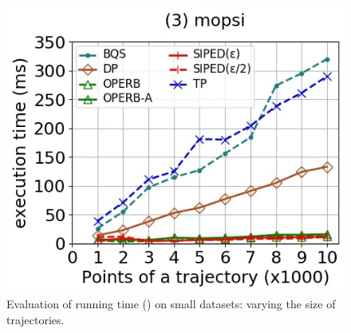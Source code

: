 {\begin{figure}[tb!]
	\includegraphics[scale=0.250]{Figures/Exp-PED-time-size-mopsi.jpg}	
	\vspace{-2ex}
	\caption{\small Evaluation of running time (\ped) on small datasets: varying the size of trajectories.}\label{fig:time-size-ped}
	\vspace{-2ex}
\end{figure}

}
